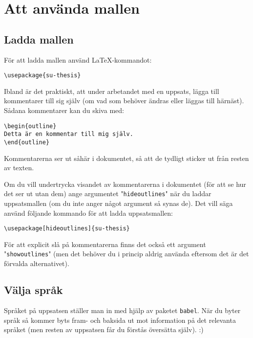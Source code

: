 
\section{Att använda mallen}
\label{mallen}


\subsection{Ladda mallen}
\label{ladda}

För att ladda mallen använd \LaTeX{}-kommandot:

\begin{verbatim}
\usepackage{su-thesis}
\end{verbatim}

Ibland är det praktiskt, att under arbetandet med en uppsats, lägga till
kommentarer till sig själv (om vad som behöver ändras eller läggas till
härnäst). Sådana kommentarer kan du skiva med:

\begin{verbatim}
\begin{outline}
Detta är en kommentar till mig själv.
\end{outline}
\end{verbatim}

\begin{outline}
Kommentarerna ser ut såhär i dokumentet, så att de tydligt sticker ut från
resten av texten.
\end{outline}

Om du vill undertrycka visandet av kommentarerna i dokumentet (för att se hur
det ser ut utan dem) ange argumentet "\texttt{hideoutlines}" när du laddar
uppsatsmallen (om du inte anger något argument så synas de). Det vill säga
använd följande kommando för att ladda uppsatsmallen:

\begin{verbatim}
\usepackage[hideoutlines]{su-thesis}
\end{verbatim}

För att explicit slå på kommentarerna finns det också ett argument
"\texttt{showoutlines}" (men det behöver du i princip aldrig använda eftersom
det är det förvalda alternativet).


\subsection{Välja språk}
\label{språk}

\noindent Språket på uppsatsen ställer man in med hjälp av paketet
\texttt{babel}. När du byter språk så kommer byts fram- och baksida ut mot
information på det relevanta språket (men resten av uppsatsen får du förstås
översätta själv). :)

